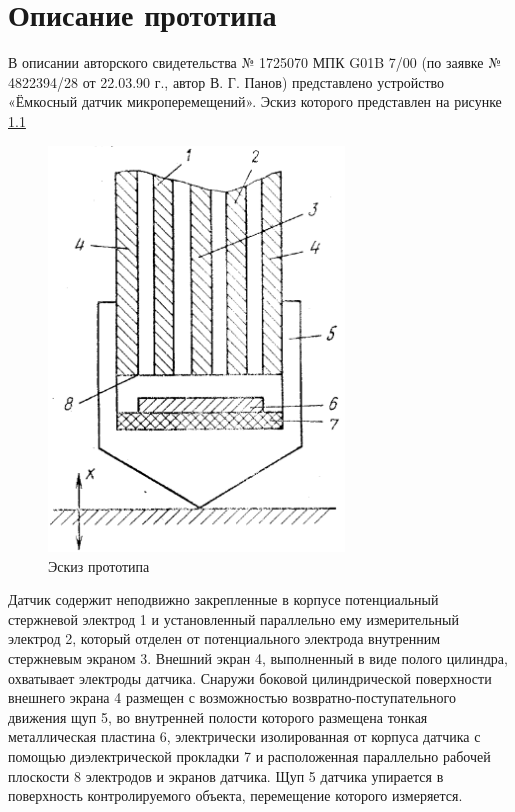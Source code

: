 
\chapter{Описание прототипа}
В описании авторского свидетельства № 1725070 МПК G01B 7/00 (по заявке № 4822394/28 от 22.03.90 г., автор В. Г. Панов) \cite{patent} представлено устройство «Ёмкосный датчик микроперемещений». Эскиз которого представлен на рисунке \ref{fig:draw}

\begin{figure}[]
    \centering
    \includegraphics[width=0.7\textwidth]{graphics/img/draw.png}
    \caption{Эскиз прототипа}
    \label{fig:draw}
\end{figure}

Датчик содержит неподвижно закрепленные в корпусе потенциальный стержневой электрод 1 и установленный параллельно ему измерительный электрод 2, который отделен от потенциального электрода внутренним стержневым экраном 3. Внешний экран 4, выполненный в виде полого цилиндра, охватывает электроды датчика. Снаружи боковой цилиндрической поверхности внешнего экрана 4 размещен с возможностью возвратно-поступательного движения щуп 5, во внутренней полости которого размещена тонкая металлическая пластина 6, электрически изолированная от корпуса датчика с помощью диэлектрической прокладки 7 и расположенная параллельно рабочей плоскости 8 электродов и экранов датчика. Щуп 5 датчика упирается в поверхность контролируемого объекта, перемещение которого измеряется. 

